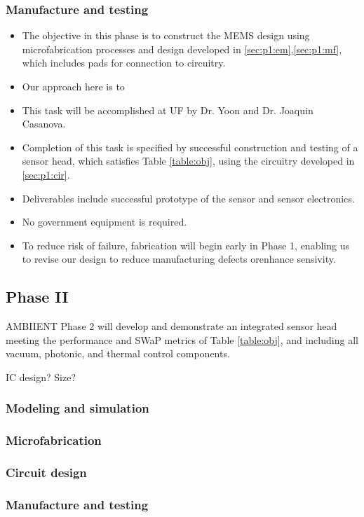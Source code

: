 \subsubsection{Manufacture and testing}
\begin{itemize}
\item The objective in this phase is to construct the MEMS design using microfabrication processes and design developed in \ref{sec:p1:em},\ref{sec:p1:mf}, which includes pads for connection to circuitry.
\item Our approach here is to 
\item This task will be accomplished at UF by Dr. Yoon and Dr. Joaquin Casanova.
\item Completion of this task is specified by successful construction and testing of a sensor head, which satisfies Table \ref{table:obj}, using the circuitry developed in \ref{sec:p1:cir}.
\item Deliverables include successful prototype of the sensor and sensor electronics.
\item No government equipment is required.
\item To reduce risk of failure, fabrication will begin early in Phase 1, enabling us to revise our design to reduce manufacturing defects orenhance sensivity. 
\end{itemize}
\subsection{Phase II}
  
AMBIIENT Phase 2 will develop and demonstrate an integrated sensor head meeting the
performance and SWaP metrics of Table \ref{table:obj}, and including all vacuum, photonic, and thermal
control components.


IC design? Size?
\subsubsection{Modeling and simulation}
\subsubsection{Microfabrication}
\subsubsection{Circuit design}
\subsubsection{Manufacture and testing}
